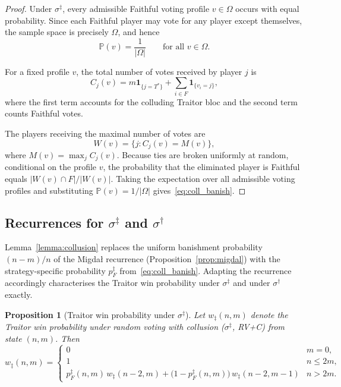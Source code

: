 \documentclass[11pt,a4paper]{article}
\newtheorem{proposition}{Proposition}
\begin{document}
\begin{proof}
Under \(\sigma^\ddagger\), every admissible Faithful voting profile
\(v\in\Omega\) occurs with equal probability. Since each Faithful player
may vote for any player except themselves, the sample space is precisely
\(\Omega\), and hence
\[
\mathbb{P}(v)=\frac1{|\Omega|}
\qquad
\text{for all } v\in\Omega.
\]

For a fixed profile \(v\), the total number of votes received by player
\(j\) is
\[
C_j(v)
=
m\mathbf 1_{\{j=T^\ast\}}
+
\sum_{i\in F}\mathbf 1_{\{v_i=j\}},
\]
where the first term accounts for the colluding Traitor bloc and the
second term counts Faithful votes.

The players receiving the maximal number of votes are
\[
W(v)=\{j : C_j(v)=M(v)\},
\]
where \(M(v)=\max_j C_j(v)\). Because ties are broken uniformly at
random, conditional on the profile \(v\), the probability that the
eliminated player is Faithful equals \(|W(v)\cap F|/|W(v)|\). Taking
the expectation over all admissible voting profiles and substituting
\(\mathbb{P}(v)=1/|\Omega|\) gives~\eqref{eq:coll_banish}.
\end{proof}

\subsection{Recurrences for \(\sigma^\ddagger\) and \(\sigma^\dagger\)}\label{sec:recurrences}

Lemma~\ref{lemma:collusion} replaces the uniform banishment probability
\((n - m)/n\) of the Migda\l{} recurrence
(Proposition~\ref{prop:migdal}) with the strategy-specific probability
\(p_F^{\ddagger}\) from~\eqref{eq:coll_banish}. Adapting the recurrence
accordingly characterises the Traitor win probability under
\(\sigma^\ddagger\) and under \(\sigma^\dagger\) exactly.

\begin{proposition}[Traitor win probability under \(\sigma^\ddagger\)]\label{prop:rvc}
Let \(w_{\ddagger}(n,m)\) denote the Traitor win probability under random
voting with collusion (\(\sigma^\ddagger\), RV+C) from state \((n, m)\). Then
\begin{equation}\label{eq:rvc}
w_{\ddagger}(n,m)
=
\begin{cases}
0 & m = 0, \\[6pt]
1 & n \leq 2m, \\[6pt]
p_F^{\ddagger}(n,m)\, w_{\ddagger}(n-2,m)
+ \bigl(1 - p_F^{\ddagger}(n,m)\bigr)\, w_{\ddagger}(n-2,m-1)
& n > 2m.
\end{cases}
\end{equation}
\end{proposition}
\end{document}
